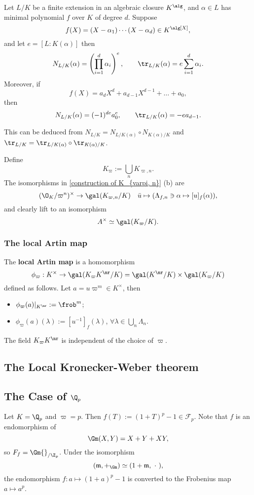 \begin{lemma}\label{compute norm and trace from minimal polynomial}
    Let $L/K$ be a finite extension in an algebraic closure $K^\alg$, and $\alpha\in L$ has minimal polynomial $f$ over $K$ of degree $d$. Suppose \[f(X) = (X-\alpha_1)\cdots(X-\alpha_d)\in K^\alg[X],\] and let $e = [L : K(\alpha)]$
    then \[N_{L/K}(\alpha) = \left(\prod_{i = 1}^d \alpha_i\right)^e,\qquad \tr_{L/K}(\alpha) = e\sum_{i = 1}^d \alpha_i.\]
    Moreover, if \[f(X) = a_dX^d + a_{d-1}X^{d-1} + \dots + a_0,\]then \[N_{L/K}(\alpha) = (-1)^{de}a_0^e,\qquad \tr_{L/K}(\alpha) = -ea_{d-1}.\]
\end{lemma}
\begin{remark}
    This can be deduced from $N_{L/K} = N_{L/K(\alpha)}\circ N_{K(\alpha)/K}$ and $\tr_{L/K} = \tr_{L/K(\alpha)}\circ \tr_{K(\alpha)/K}$.
\end{remark}


Define \[K_\varpi := \bigcup_{n} K_{\varpi, n}.\]
The isomorphisms in \cref{construction of K_{varpi, n}} (b) are \[(\O_K/\varpi^n)^\times\to \gal(K_{\varpi, n}/K)\quad \bar{u}\mapsto (\Lambda_{f, n}\ni \alpha\mapsto [u]_f(\alpha)),\] and clearly lift to an isomorphism \[A^\times\simeq \gal(K_\varpi/K).\]

\subsubsection*{The local Artin map}
The \textbf{local Artin map} is a homomorphism \[\phi_\varpi : K^\times\to \gal(K_\varpi K^\nr/K) = \gal(K^\nr/K)\times \gal(K_\varpi/K)\] defined as follows.
Let $a = u\varpi^m\in K^\times$, then 
\begin{itemize}
    \item $\phi_\varpi(a)|_{K^\nr} := \frob^m$;
    \item $\phi_\varpi(a)(\lambda) := [u^{-1}]_f(\lambda)$, $\forall \lambda\in\bigcup_n\Lambda_n$.
\end{itemize}

\begin{theorem}
    The field $K_{\varpi}K^\nr$ is independent of the choice of $\varpi$.
\end{theorem}


\subsection{The Local Kronecker-Weber theorem}

\subsection{The Case of \texorpdfstring{$\Q_p$}{}}
Let $K = \Q_p$ and $\varpi = p$. Then $f(T) := (1 + T)^p - 1\in\mathcal{F}_p$.
Note that $f$ is an endomorphism of \[\Gm(X, Y) = X + Y + XY,\] so $F_f = \Gm{}_{/\Z_p}$. Under the isomorphism
\[(\mathfrak{m}, +_{\Gm})\simeq (1 + \mathfrak{m},\ \cdot\ ),\]
the endomorphism $f : a\mapsto (1 + a)^p - 1$ is converted to the Frobenius map $a\mapsto a^p$.

